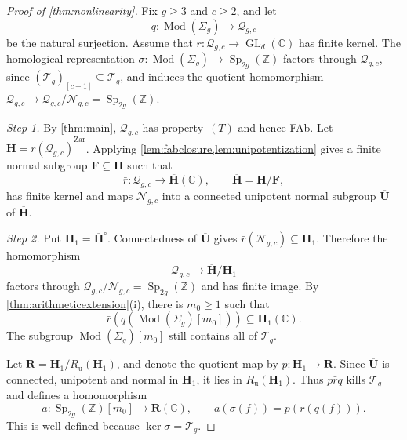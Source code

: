 \documentclass[11pt,a4paper]{article}
\theoremstyle{definition}
\newcommand{\Z}{\mathbb Z}
\newcommand{\C}{\mathbb C}
\newcommand{\Mod}{\operatorname{Mod}}
\newcommand{\Sp}{\operatorname{Sp}}
\newcommand{\GL}{\operatorname{GL}}
\newcommand{\rt}{(T)}
\newcommand{\Ru}{R_{\mathrm u}}
\begin{document}
\begin{proof}[Proof of \cref{thm:nonlinearity}]
Fix \(g\ge3\) and \(c\ge2\), and let
\[
 q:\Mod(\Sigma_g)\to\mathcal{Q}_{g,c}
\]
be the natural surjection.
Assume that \(r:\mathcal{Q}_{g,c}\to\GL_d(\C)\) has finite kernel. The
homological representation \(\sigma:\Mod(\Sigma_g)\to\Sp_{2g}(\Z)\)
factors through \(\mathcal{Q}_{g,c}\), since \((\mathcal{T}_g)_{[c+1]}\subseteq\mathcal{T}_g\),
and induces the quotient homomorphism
\(\mathcal{Q}_{g,c}\to\mathcal{Q}_{g,c}/\mathcal{N}_{g,c}=\Sp_{2g}(\Z)\).

\emph{Step 1.} By \cref{thm:main}, \(\mathcal{Q}_{g,c}\) has property~\(\rt\)
and hence FAb. Let \(\mathbf H=\overline{r(\mathcal{Q}_{g,c})}^{\mathrm{Zar}}\).
Applying \cref{lem:fabclosure,lem:unipotentization} gives a finite
normal subgroup \(\mathbf F\subseteq\mathbf H\) such that
\[
 \bar r:\mathcal{Q}_{g,c}\longrightarrow\overline{\mathbf H}(\C),
 \qquad \overline{\mathbf H}=\mathbf H/\mathbf F,
\]
has finite kernel and maps \(\mathcal{N}_{g,c}\) into a connected unipotent normal
subgroup \(\overline{\mathbf U}\) of \(\overline{\mathbf H}\).

\emph{Step 2.} Put \(\mathbf H_1=\overline{\mathbf H}^{\circ}\).
Connectedness of \(\overline{\mathbf U}\) gives
\(\bar r(\mathcal{N}_{g,c})\subseteq\mathbf H_1\). Therefore the homomorphism
\[
 \mathcal{Q}_{g,c}\longrightarrow\overline{\mathbf H}/\mathbf H_1
\]
factors through \(\mathcal{Q}_{g,c}/\mathcal{N}_{g,c}=\Sp_{2g}(\Z)\) and has finite
image. By \cref{thm:arithmeticextension}(i), there is \(m_0\ge1\)
such that
\[
 \bar r(q(\Mod(\Sigma_g)[m_0]))\subseteq\mathbf H_1(\C).
\]
The subgroup \(\Mod(\Sigma_g)[m_0]\) still contains all of \(\mathcal{T}_g\).

Let \(\mathbf R=\mathbf H_1/\Ru(\mathbf H_1)\), and denote
the quotient map by \(p:\mathbf H_1\to\mathbf R\). Since
\(\overline{\mathbf U}\) is connected, unipotent and normal in
\(\mathbf H_1\), it lies in \(\Ru(\mathbf H_1)\). Thus
\(p\bar r q\) kills \(\mathcal{T}_g\) and defines a homomorphism
\[
 a:\Sp_{2g}(\Z)[m_0]\longrightarrow\mathbf R(\C),
 \qquad a(\sigma(f))=p(\bar r(q(f))).
\]
This is well defined because \(\ker\sigma=\mathcal{T}_g\).


\end{proof}
\end{document}
